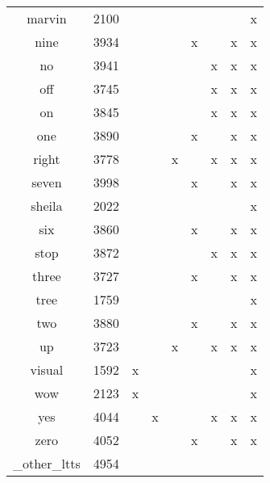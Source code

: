 \begin{table}[h!]
\begin{tabular}{|c|c|ccccccc|}
        \hline
        marvin & 2100         &   &   &   &   &   &   & x  \\
        nine & 3934           &   &   &   & x &   & x & x  \\
        no & 3941             &   &   &   &   & x & x & x  \\
        off & 3745            &   &   &   &   & x & x & x  \\
        \hline
        on & 3845             &   &   &   &   & x & x & x  \\
        one & 3890            &   &   &   & x &   & x & x  \\
        right & 3778          &   &   & x &   & x & x & x  \\
        seven & 3998          &   &   &   & x &   & x & x  \\
        \hline
        sheila & 2022         &   &   &   &   &   &   & x  \\
        six & 3860            &   &   &   & x &   & x & x  \\
        stop & 3872           &   &   &   &   & x & x & x  \\
        three & 3727          &   &   &   & x &   & x & x  \\
        \hline
        tree & 1759           &   &   &   &   &   &   & x  \\
        two & 3880            &   &   &   & x &   & x & x  \\
        up & 3723             &   &   & x &   & x & x & x  \\
        visual & 1592         & x &   &   &   &   &   & x  \\
        \hline
        wow & 2123            & x &   &   &   &   &   & x  \\
        yes & 4044            &   & x &   &   & x & x & x  \\
        zero & 4052           &   &   &   & x &   & x & x  \\
        \_other\_ltts & 4954  &   &   &   &   &   &   &    \\
        \hline
    \end{tabular}
\end{table}

